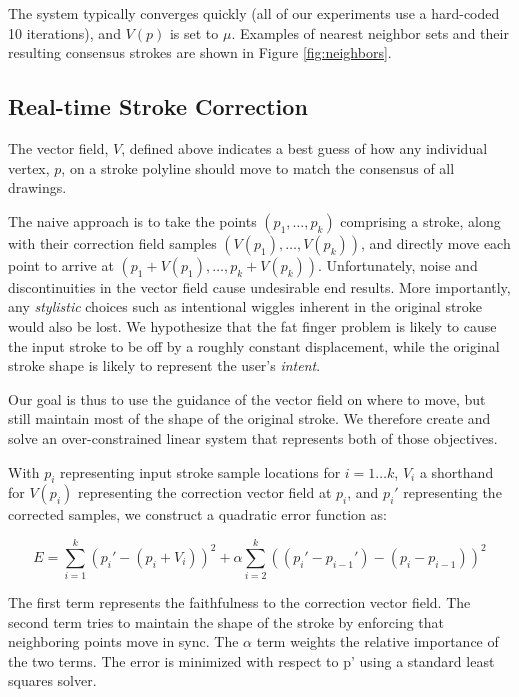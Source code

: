 The system typically converges quickly (all of our experiments use a hard-coded 10 iterations), and $V(p)$ is set to $\mu$.  Examples of nearest neighbor sets and their resulting consensus strokes are shown in Figure \ref{fig:neighbors}.

\subsection{Real-time Stroke Correction}


The vector field, $V$, defined above indicates a best guess of how any individual vertex, $p$, on a stroke polyline should move to match the consensus of all drawings.

The naive approach is to take the points $(p_1, \ldots, p_k)$ comprising a stroke, along with their correction field samples $(V(p_1), \ldots, V(p_k))$, and directly move each point to arrive at $(p_1 + V(p_1), \ldots, p_k + V(p_k))$.  Unfortunately, noise and discontinuities in the vector field cause undesirable end results. More importantly, any {\em stylistic} choices such as intentional wiggles inherent in the original stroke would also be lost.  We hypothesize that the fat finger problem is likely to cause the input stroke to be off by a roughly constant displacement, while the original stroke shape is likely to represent the user's {\em intent}.

Our goal is thus to use the guidance of the vector field on where to move, but still maintain most of the shape of the original stroke.  We therefore create and solve an over-constrained linear system that represents both of those objectives.

With $p_i$ representing input stroke sample locations for $i=1\ldots k$, $V_i$ a shorthand for $V(p_i)$ representing the correction vector field at $p_i$, and $p_i'$ representing the corrected samples, we construct a quadratic error function as:

\begin{equation}
E =  \sum_{i=1}^k (p_i' - (p_i + V_i))^2 +  \alpha \sum_{i=2}^k ((p_i' - p_{i-1}') - (p_i - p_{i-1}))^2
\end{equation}

The first term represents the faithfulness to the correction vector field. The second term tries to maintain the shape of the stroke by enforcing that neighboring points move in sync. The $\alpha$ term weights the relative importance of the two terms. The error is minimized with respect to p' using a standard least squares solver.


